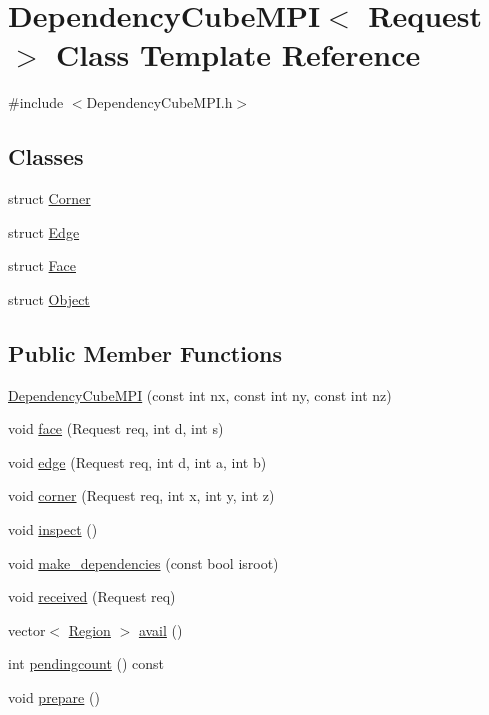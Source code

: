 \hypertarget{class_dependency_cube_m_p_i}{}\section{Dependency\+Cube\+M\+P\+I$<$ Request $>$ Class Template Reference}
\label{class_dependency_cube_m_p_i}


{\ttfamily \#include $<$Dependency\+Cube\+M\+P\+I.\+h$>$}

\subsection*{Classes}
\begin{DoxyCompactItemize}
\item 
struct \hyperlink{struct_dependency_cube_m_p_i_1_1_corner}{Corner}
\item 
struct \hyperlink{struct_dependency_cube_m_p_i_1_1_edge}{Edge}
\item 
struct \hyperlink{struct_dependency_cube_m_p_i_1_1_face}{Face}
\item 
struct \hyperlink{struct_dependency_cube_m_p_i_1_1_object}{Object}
\end{DoxyCompactItemize}
\subsection*{Public Member Functions}
\begin{DoxyCompactItemize}
\item 
\hyperlink{class_dependency_cube_m_p_i_a52c63b5bddd26821abe26367cc24245c}{Dependency\+Cube\+M\+P\+I} (const int nx, const int ny, const int nz)
\item 
void \hyperlink{class_dependency_cube_m_p_i_a057adc047896117c998e5709d8a83d43}{face} (Request req, int d, int s)
\item 
void \hyperlink{class_dependency_cube_m_p_i_a3c346f1108cb4f571a250b5a6e3cd868}{edge} (Request req, int d, int a, int b)
\item 
void \hyperlink{class_dependency_cube_m_p_i_a797a6e9d3cb5d7edf9439f4abbf27b05}{corner} (Request req, int x, int y, int z)
\item 
void \hyperlink{class_dependency_cube_m_p_i_a249049eaa66b401dec5b777f91cf14fa}{inspect} ()
\item 
void \hyperlink{class_dependency_cube_m_p_i_a65a7562678c7f9d7ab63780ffbdfac87}{make\+\_\+dependencies} (const bool isroot)
\item 
void \hyperlink{class_dependency_cube_m_p_i_a6b7972db814a3469a2774946ba3062a4}{received} (Request req)
\item 
vector$<$ \hyperlink{struct_region}{Region} $>$ \hyperlink{class_dependency_cube_m_p_i_a95e03004604866099b5acf0af2cf3b1a}{avail} ()
\item 
int \hyperlink{class_dependency_cube_m_p_i_a9b187ce4ca44a150d71e55c35325afba}{pendingcount} () const 
\item 
void \hyperlink{class_dependency_cube_m_p_i_abd4e8187ccfe651ded18f8c5c10fa691}{prepare} ()
\end{DoxyCompactItemize}

